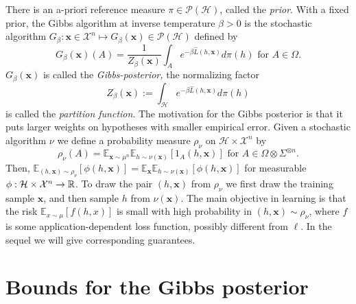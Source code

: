 \documentclass{article} %
\begin{document}
There is an a-priori reference measure $\pi \in \mathcal{P}\left( \mathcal{H}%
\right) $, called the \textit{prior}. With a fixed prior, the Gibbs algorithm
at inverse temperature $\beta >0$ is the stochastic algorithm $G_{\beta }:%
\mathbf{x}\in \mathcal{X}^{n}\mapsto G_{\beta }\left( \mathbf{x}\right) \in 
\mathcal{P}\left( \mathcal{H}\right) $ defined by%
\begin{equation*}
G_{\beta }\left( \mathbf{x}\right) \left( A\right) =\frac{1}{Z_{\beta
}\left( \mathbf{x}\right) }\int_{A}e^{-\beta \hat{L}\left( h,\mathbf{x}%
\right) }d\pi \left( h\right) \text{ for }A\in \Omega \text{.}
\end{equation*}%
$G_{\beta }\left( \mathbf{x}\right) $ is called the \textit{Gibbs-posterior, 
}the normalizing factor 
\begin{equation*}
Z_{\beta }\left( \mathbf{x}\right) :=\int_{\mathcal{H}}e^{-\beta \hat{L}%
\left( h,\mathbf{x}\right) }d\pi \left( h\right)
\end{equation*}%
is called the \textit{partition function}. The motivation for the Gibbs posterior is that it puts larger weights on hypotheses with smaller empirical error.\newline 
Given a stochastic algorithm $\nu $ we define a probability measure $\rho
_{\nu }$ on $\mathcal{H}\times \mathcal{X}^{n}$ by 
\begin{equation}
\rho _{\nu }\left( A\right) =\mathbb{E}_{\mathbf{x}\sim \mu ^{n}}\mathbb{E}%
_{h\sim \nu \left( \mathbf{x}\right) }\left[ 1_{A}\left( h,\mathbf{x}\right) %
\right] \text{ for }A\in \Omega \otimes \Sigma ^{\otimes n}.
\label{Define rho}
\end{equation}%
Then, $\mathbb{E}_{\left( h,\mathbf{x}\right) \sim \rho _{\nu }}\left[ \phi
\left( h,\mathbf{x}\right) \right] =\mathbb{E}_{\mathbf{x}}\mathbb{E}_{h\sim
\nu \left( \mathbf{x}\right) }\left[ \phi \left( h,\mathbf{x}\right) \right] 
$ for measurable $\phi :\mathcal{H}\times \mathcal{X}^{n}\rightarrow \mathbb{%
R}$. To draw the pair $\left( h,\mathbf{x}\right) $ from $\rho _{\nu }$ we
first draw the training sample $\mathbf{x}$, and then sample $h$ from $\nu
\left( \mathbf{x}\right) $. The main objective in learning is that the risk $%
\mathbb{E}_{x\sim \mu }\left[ f\left( h,x\right) \right] $ is small with
high probability in $\left( h,\mathbf{x}\right) \sim \rho _{\nu }$, where $f$
is some application-dependent loss function, possibly different from $\ell $. In the sequel we will give corresponding guarantees.
\section{Bounds for the Gibbs posterior}
\end{document}
